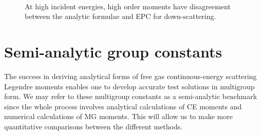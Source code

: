 \documentclass[review]{elsarticle}
\begin{document}
\begin{figure}[ht!]
	\centering
	~
	\caption{At high incident energies, high order moments have disagreement between the analytic formulae and EPC for  down-scattering.}
	\label{fg:bdhigh}
\end{figure}

\section{Semi-analytic group constants}
The success in deriving analytical forms of free gas continuous-energy scattering Legendre moments enables one to develop accurate test solutions in multigroup form. We may refer to these multigroup constants as a semi-analytic benchmark since the whole process involves analytical calculations of CE moments and numerical calculations of MG moments. This will allow us to make more quantitative comparisons between the different methods.
\end{document}

